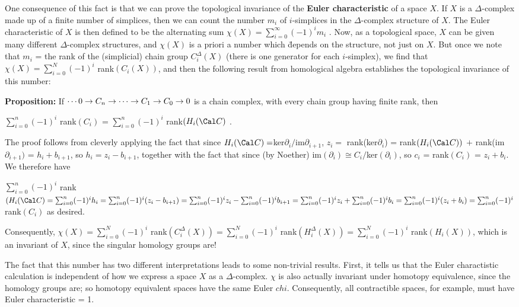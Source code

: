 \msk

One consequence of this fact is that we can prove the topological invariance of the {\bf Euler
characteristic} of a space $X$. If $X$ is a $\Delta$-complex made up of a finite number of 
simplices, then we can count the number $m_i$ of $i$-simplices in the $\Delta$-complex 
structure of $X$. The Euler characteristic of $X$ is then defined to be the alternating sum
$\chi(X) = \displaystyle \sum_{i=0}^\infty (-1)^i m_i$ . Now, as a topological space, $X$ can be given 
many different $\Delta$-complex structures, and $\chi(X)$ is a priori a number which \u{depends} 
on the structure, not just on $X$. But once we note that $m_i$ = the rank of the (simplicial) 
chain group $C_i^\Delta(X)$ (there is one generator for each $i$-simplex), we find that 
$\chi(X) = \sum_{i=0}^N (-1)^i$ rank$(C_i(X))$, and then the following result from homological algebra
establishes the topological invariance of this number:

\ssk

{\bf Proposition:} If $\cdots 0\rightarrow C_n\rightarrow \cdots \rightarrow C_1\rightarrow C_0 \rightarrow 0$ is a chain complex, with every 
chain group having finite rank, then 

\ssk

$\sum_{i=0}^n (-1)^i$ rank$(C_i)$ = $\sum_{i=0}^n (-1)^i$ rank$(H_i({\Cal C})$ .

\ssk

The proof follows from cleverly applying the fact that since $H_i({\Cal C}) = $ker$\partial_i/$im$\partial_{i+1}$,
$z_i =$ rank(ker$\partial_i$) = rank$(H_i({\Cal C}))$ $+$ rank(im$\partial_{i+1})$ = $h_i+b_{i+1}$, so
$h_i=z_i-b_{i+1}$,
together with the fact that since (by Noether) im$(\partial_i) \cong C_i/$ker$(\partial_i)$, so 
$c_i$ = rank$(C_i)$ = $z_i+b_i$. We therefore have 

\ssk

$\sum_{i=0}^n (-1)^i$ rank$(H_i({\Cal C}) = \sum_{i=0}^n (-1)^i h_i = \sum_{i=0}^n (-1)^i (z_i-b_{i+1})
 =\sum_{i=0}^n (-1)^i z_i - \sum_{i=0}^n (-1)^i b_{i+1} = \sum_{i=0}^n (-1)^i z_i + \sum_{i=0}^n (-1)^i b_i
=\sum_{i=0}^n (-1)^i (z_i + b_i) =\sum_{i=0}^n (-1)^i$ rank$(C_i)$ 
\hhsk
as desired. 

Consequently, $\chi(X) = \sum_{i=0}^N (-1)^i$ rank$(C_i^\Delta(X)) =
\sum_{i=0}^N (-1)^i$ rank$(H_i^\Delta(X)) = \sum_{i=0}^N (-1)^i$ rank$(H_i(X))$, which is 
an invariant of $X$, since the singular homology groups are!

\msk

The fact that this number has two different interpretations leads to some non-trivial results.
First, it tells us that the Euler charactistic calculation is independent of how we express a space $X$ as
a $\Delta$-complex. $\chi$ is also actually invariant under homotopy equivalence,
since the homology groups are; so homotopy equivalent spaces have the
same Euler $chi$. Consequently, all contractible spaces, for example, must have
Euler characteristic = 1.

